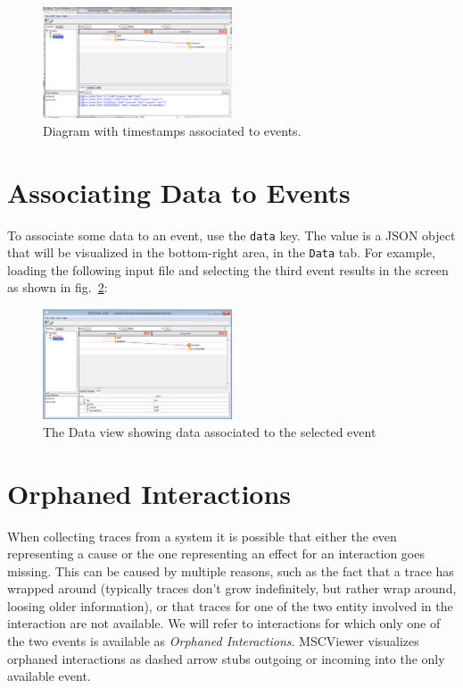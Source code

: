 \documentclass[11pt, twoside, titlepage]{book}
\newcommand{\prog}{MSCViewer}
\newcommand{\defterm}[1]{\textit{#1}\index{#1}}
\begin{document}
%
\begin{figure}[ht!]
  \centering
  \includegraphics[width=0.5\textwidth,natwidth=1024,natheight=600]{gui-ex4-time.png}
  \caption{Diagram with timestamps associated to events.}
  \label{fig:gui-lst4}
\end{figure} 


\section{Associating Data to Events}
To associate some data to an event, use the \texttt{data} key. The value is a
JSON object that will be visualized in the bottom-right area, in the
\texttt{Data} tab. For example, loading the following input file  and selecting
the third event results in the screen as shown in fig.~\ref{fig:gui-lst5}:

\begin{minipage}{\linewidth} 

\end{minipage}


\begin{figure}[ht!]
  \centering
  \includegraphics[width=0.5\textwidth,natwidth=1024,natheight=600]{gui-ex5-data.png}
  \caption{The Data view showing data associated to the selected event}
  \label{fig:gui-lst5}
\end{figure}

\section{Orphaned Interactions}
When collecting traces from a system it is possible that either the even
representing a cause or the one representing an effect for an interaction goes
missing. This can be caused by multiple reasons, such as the fact that a trace
has wrapped around (typically traces don't grow indefinitely, but rather wrap
around, loosing older information), or that traces for one of the two entity
involved in the interaction are not available. We will refer to interactions for
which only one of the two events is available as \defterm{Orphaned
Interactions}.
\prog{} visualizes orphaned interactions as dashed arrow stubs outgoing or
incoming into the only available event.
\end{document}

